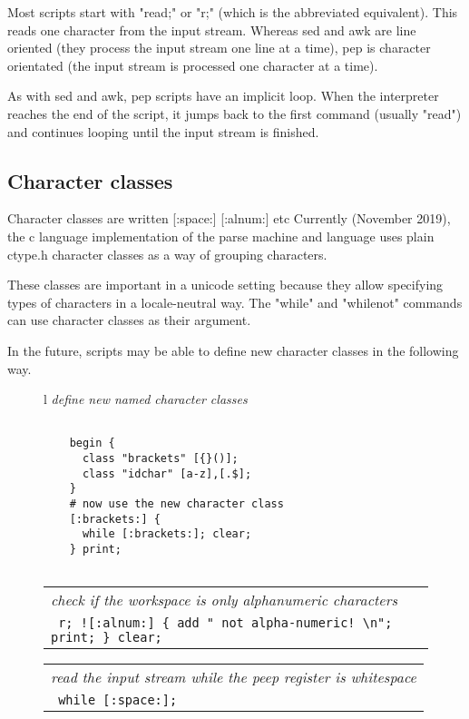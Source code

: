 \documentclass[a4paper,12pt]{article}
\begin{document}
  Most scripts start with "read;" or "r;" (which is the abbreviated
  equivalent). This reads one character from the input stream. Whereas sed
  and awk are line oriented (they process the input stream one line at a
  time), pep is character orientated (the input stream is processed one
  character at a time).

  As with sed and awk, pep scripts have an implicit loop. When the interpreter
  reaches the end of the script, it jumps back to the first command (usually
  "read") and continues looping until the input stream is finished.

\subsection{Character classes}

  Character classes are written [:space:] [:alnum:] etc Currently (November
  2019), the c language implementation of the parse machine and language uses
  plain ctype.h character classes as a way of grouping characters.

  These classes are important in a unicode setting because they allow
  specifying types of characters in a locale-neutral way. The "while" and
  "whilenot" commands can use character classes as their argument.

  In the future, scripts may be able to define new character classes
  in the following way.
 \begin{figure}
 \begin{tabular}{ l }
 \emph{ define new named character classes } \\ 
 \begin{lstlisting}[breaklines] 

    begin { 
      class "brackets" [{}()]; 
      class "idchar" [a-z],[.$]; 
    } 
    # now use the new character class
    [:brackets:] {
      while [:brackets:]; clear;
    } print;
  
 \end{lstlisting} 
 \end{tabular} 

 \end{figure}
 \begin{figure}
 \begin{tabular}{ l }
 \emph{ check if the workspace is only alphanumeric characters  } \\ 
 \verb| r; ![:alnum:] { add " not alpha-numeric! \n"; print; } clear; |
 \end{tabular} 
 \end{figure}
 \begin{figure}
 \begin{tabular}{ l }
 \emph{ read the input stream while the peep register is whitespace } \\ 
 \verb| while [:space:]; |
 \end{tabular} 
 \end{figure}
\end{document}
